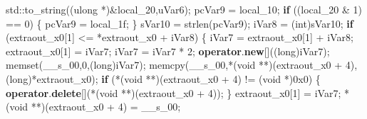 \documentclass[
]{article}
\newenvironment{Shaded}{}{}
\newcommand{\BaseNTok}[1]{\textcolor[rgb]{0.25,0.63,0.44}{#1}}
\newcommand{\BuiltInTok}[1]{\textcolor[rgb]{0.00,0.50,0.00}{#1}}
\newcommand{\ControlFlowTok}[1]{\textcolor[rgb]{0.00,0.44,0.13}{\textbf{#1}}}
\newcommand{\DataTypeTok}[1]{\textcolor[rgb]{0.56,0.13,0.00}{#1}}
\newcommand{\DecValTok}[1]{\textcolor[rgb]{0.25,0.63,0.44}{#1}}
\newcommand{\ExtensionTok}[1]{#1}
\newcommand{\KeywordTok}[1]{\textcolor[rgb]{0.00,0.44,0.13}{\textbf{#1}}}
\newcommand{\NormalTok}[1]{#1}
\newcommand{\OperatorTok}[1]{\textcolor[rgb]{0.40,0.40,0.40}{#1}}
\begin{document}
\begin{Shaded}
\begin{Highlighting}[]
  \BuiltInTok{std::}\NormalTok{to\_string}\OperatorTok{((}\ExtensionTok{ulong} \OperatorTok{*)\&}\NormalTok{local\_20}\OperatorTok{,}\NormalTok{uVar6}\OperatorTok{);}
\NormalTok{  pcVar9 }\OperatorTok{=}\NormalTok{ local\_10}\OperatorTok{;}
  \ControlFlowTok{if} \OperatorTok{((}\NormalTok{local\_20 }\OperatorTok{\&} \DecValTok{1}\OperatorTok{)} \OperatorTok{==} \DecValTok{0}\OperatorTok{)} \OperatorTok{\{}
\NormalTok{    pcVar9 }\OperatorTok{=}\NormalTok{ local\_1f}\OperatorTok{;}
  \OperatorTok{\}}
\NormalTok{  sVar10 }\OperatorTok{=}\NormalTok{ strlen}\OperatorTok{(}\NormalTok{pcVar9}\OperatorTok{);}
\NormalTok{  iVar8 }\OperatorTok{=} \OperatorTok{(}\DataTypeTok{int}\OperatorTok{)}\NormalTok{sVar10}\OperatorTok{;}
  \ControlFlowTok{if} \OperatorTok{(}\NormalTok{extraout\_x0}\OperatorTok{[}\DecValTok{1}\OperatorTok{]} \OperatorTok{\textless{}=} \OperatorTok{*}\NormalTok{extraout\_x0 }\OperatorTok{+}\NormalTok{ iVar8}\OperatorTok{)} \OperatorTok{\{}
\NormalTok{    iVar7 }\OperatorTok{=}\NormalTok{ extraout\_x0}\OperatorTok{[}\DecValTok{1}\OperatorTok{]} \OperatorTok{+}\NormalTok{ iVar8}\OperatorTok{;}
\NormalTok{    extraout\_x0}\OperatorTok{[}\DecValTok{1}\OperatorTok{]} \OperatorTok{=}\NormalTok{ iVar7}\OperatorTok{;}
\NormalTok{    iVar7 }\OperatorTok{=}\NormalTok{ iVar7 }\OperatorTok{*} \DecValTok{2}\OperatorTok{;}
    \KeywordTok{operator}\OperatorTok{.}\KeywordTok{new}\OperatorTok{[]((}\DataTypeTok{long}\OperatorTok{)}\NormalTok{iVar7}\OperatorTok{);}
\NormalTok{    memset}\OperatorTok{(}\NormalTok{\_\_s\_00}\OperatorTok{,}\DecValTok{0}\OperatorTok{,(}\DataTypeTok{long}\OperatorTok{)}\NormalTok{iVar7}\OperatorTok{);}
\NormalTok{    memcpy}\OperatorTok{(}\NormalTok{\_\_s\_00}\OperatorTok{,*(}\DataTypeTok{void} \OperatorTok{**)(}\NormalTok{extraout\_x0 }\OperatorTok{+} \DecValTok{4}\OperatorTok{),(}\DataTypeTok{long}\OperatorTok{)*}\NormalTok{extraout\_x0}\OperatorTok{);}
    \ControlFlowTok{if} \OperatorTok{(*(}\DataTypeTok{void} \OperatorTok{**)(}\NormalTok{extraout\_x0 }\OperatorTok{+} \DecValTok{4}\OperatorTok{)} \OperatorTok{!=} \OperatorTok{(}\DataTypeTok{void} \OperatorTok{*)}\BaseNTok{0x0}\OperatorTok{)} \OperatorTok{\{}
      \KeywordTok{operator}\OperatorTok{.}\KeywordTok{delete}\OperatorTok{[](*(}\DataTypeTok{void} \OperatorTok{**)(}\NormalTok{extraout\_x0 }\OperatorTok{+} \DecValTok{4}\OperatorTok{));}
    \OperatorTok{\}}
\NormalTok{    extraout\_x0}\OperatorTok{[}\DecValTok{1}\OperatorTok{]} \OperatorTok{=}\NormalTok{ iVar7}\OperatorTok{;}
    \OperatorTok{*(}\DataTypeTok{void} \OperatorTok{**)(}\NormalTok{extraout\_x0 }\OperatorTok{+} \DecValTok{4}\OperatorTok{)} \OperatorTok{=}\NormalTok{ \_\_s\_00}\OperatorTok{;}

\end{Highlighting}
\end{Shaded}
\end{document}
